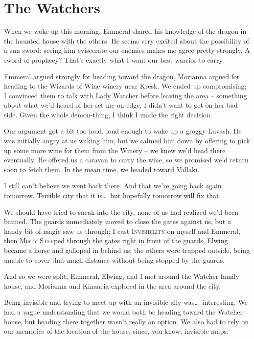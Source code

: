 
\section*{The Watchers}
When we woke up this morning, Emmeral shared his knowledge of the dragon in the haunted house with the others. He seems very excited about the possibility of a sun sword; seeing him eviscerate our enemies makes me agree pretty strongly. A sword of prophecy? That's exactly what I want our best warrior to carry.

Emmeral argued strongly for heading toward the dragon, Morianna argued for heading to the Wizards of Wine winery near Kresk. We ended up compromising; I convinced them to talk with Lady Watcher before leaving the area -- something about what we'd heard of her set me on edge, I didn't want to get on her bad side. Given the whole demon-thing, I think I made the right decision.

Our argument got a bit too loud, loud enough to wake up a groggy Luvash. He was initially angry at us waking him, but we calmed him down by offering to pick up some more wine for them from the Winery -- we knew we'd head there eventually. He offered us a caravan to carry the wine, so we promised we'd return soon to fetch them. In the mean time, we headed toward Vallaki.

I still can't believe we went back there. And that we're going back again tomorrow. Terrible city that it is\dots\ but hopefully tomorrow will fix that.

We should have tried to sneak into the city, none of us had realized we'd been banned. The guards immediately moved to close the gates against us, but a handy bit of magic saw us through: I cast \textsc{Invisibility} on myself and Emmeral, then \textsc{Misty Step}ped through the gates right in front of the guards. Elwing became a horse and galloped in behind us; the others were trapped outside, being unable to cover that much distance without being stopped by the guards.

And so we were split; Emmeral, Elwing, and I met around the Watcher family house, and Morianna and Kinaaeia explored in the area around the city.

Being invisible and trying to meet up with an invisible ally was\dots\ interesting. We had a vague understanding that we would both be heading toward the Watcher house, but heading there together wasn't really an option. We also had to rely on our memories of the location of the house, since, you know, invisible maps.

